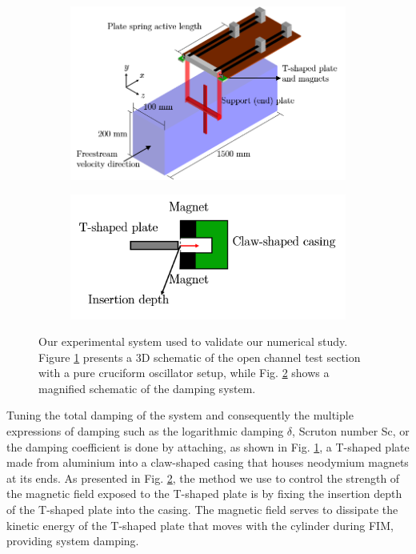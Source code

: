 \documentclass[a4paper,fleqn]{cas-sc}
\begin{document}
\begin{figure}
  \centering
  \begin{subfigure}[h]{0.5\textwidth}
    \includegraphics[width=\textwidth]{figs/rigSketch}
    \caption{}
    \label{fig:rigSketch}
  \end{subfigure}

  \begin{subfigure}[h]{0.35\textwidth}
    \includegraphics[width=\textwidth]{figs/damperSketch}
    \caption{}
    \label{fig:damperSketch}
  \end{subfigure}

  \caption{Our experimental system used to validate our numerical study. Figure \ref{fig:rigSketch} presents a 3D schematic of the open channel test section with a pure cruciform oscillator setup, while Fig. \ref{fig:damperSketch} shows a magnified schematic of the damping system.} \label{fig:experimentalSetup}
\end{figure}

Tuning the total damping of the system and consequently the multiple expressions of damping such as the logarithmic damping $\delta$, Scruton number Sc, or the damping coefficient is done by attaching, as shown in Fig. \ref{fig:rigSketch}, a T-shaped plate made from aluminium into a claw-shaped casing that houses neodymium magnets at its ends. As presented in Fig. \ref{fig:damperSketch}, the method we use to control the strength of the magnetic field exposed to the T-shaped plate is by fixing the insertion depth of the T-shaped plate into the casing. The magnetic field serves to dissipate the kinetic energy of the T-shaped plate that moves with the cylinder during FIM, providing system damping.
\end{document}
